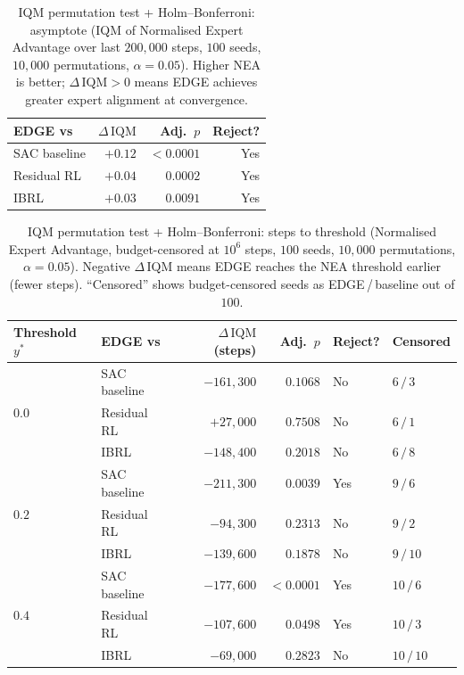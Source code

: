 \begin{table}[h]
\centering
\caption{IQM permutation test + Holm–Bonferroni: asymptote
         (IQM of Normalised Expert Advantage over last $200{,}000$ steps,
         $100$ seeds, $10{,}000$ permutations, $\alpha=0.05$).
         Higher NEA is better; $\Delta\,\mathrm{IQM} > 0$ means EDGE achieves
         greater expert alignment at convergence.}
\label{tab:stats_asymptote}
\begin{tabular}{lrrr}
\toprule
\textbf{EDGE vs} & \textbf{$\Delta\,\mathrm{IQM}$} & \textbf{Adj.\ $p$} & \textbf{Reject?} \\
\midrule
SAC baseline  & $+0.12$ & $<0.0001$ & Yes \\
Residual RL   & $+0.04$ & $0.0002$  & Yes \\
IBRL          & $+0.03$ & $0.0091$  & Yes \\
\bottomrule
\end{tabular}
\end{table}

\begin{table}[h]
\centering
\caption{IQM permutation test + Holm–Bonferroni: steps to threshold
         (Normalised Expert Advantage, budget-censored at $10^6$ steps,
         $100$ seeds, $10{,}000$ permutations, $\alpha=0.05$).
         Negative $\Delta\,\mathrm{IQM}$ means EDGE reaches the NEA threshold
         earlier (fewer steps).
         ``Censored'' shows budget-censored seeds as EDGE\,/\,baseline out of $100$.}
\label{tab:stats_thresholds}
\begin{tabular}{llrrll}
\toprule
\textbf{Threshold $y^*$} & \textbf{EDGE vs} & \textbf{$\Delta\,\mathrm{IQM}$ (steps)} & \textbf{Adj.\ $p$} & \textbf{Reject?} & \textbf{Censored} \\
\midrule
\multirow{3}{*}{$0.0$}
  & SAC baseline & $-161{,}300$ & $0.1068$  & No  & $6\,/\,3$  \\
  & Residual RL  & $+27{,}000$  & $0.7508$  & No  & $6\,/\,1$  \\
  & IBRL         & $-148{,}400$ & $0.2018$  & No  & $6\,/\,8$  \\
\midrule
\multirow{3}{*}{$0.2$}
  & SAC baseline & $-211{,}300$ & $0.0039$  & Yes & $9\,/\,6$  \\
  & Residual RL  & $-94{,}300$  & $0.2313$  & No  & $9\,/\,2$  \\
  & IBRL         & $-139{,}600$ & $0.1878$  & No  & $9\,/\,10$ \\
\midrule
\multirow{3}{*}{$0.4$}
  & SAC baseline & $-177{,}600$ & $<0.0001$ & Yes & $10\,/\,6$  \\
  & Residual RL  & $-107{,}600$ & $0.0498$  & Yes & $10\,/\,3$  \\
  & IBRL         & $-69{,}000$  & $0.2823$  & No  & $10\,/\,10$ \\
\bottomrule
\end{tabular}
\end{table}
